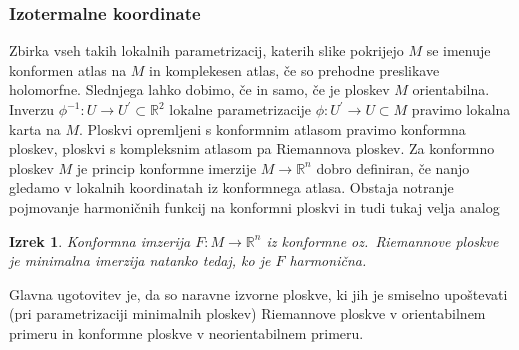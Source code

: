 \documentclass[8pt]{beamer}
\theoremstyle{definition}
\theoremstyle{remark}
\theoremstyle{plain}
\newtheorem{izrek}[definicija]{Izrek}
\numberwithin{equation}{section}  %
\begin{document}
\begin{frame}
    \frametitle{Izotermalne koordinate}
                                                                                                                                                                                                                                                    
    Zbirka vseh takih lokalnih parametrizacij, katerih slike pokrijejo $M$ se imenuje \textcolor{red1}{konformen atlas} na $M$ in \textcolor{red1}{komplekesen atlas}, če so prehodne preslikave holomorfne. Slednjega lahko dobimo, če in samo, če je ploskev $M$ orientabilna. Inverzu $\phi^{-1}: U \rightarrow U^{\prime} \subset \mathbb{R}^2$ lokalne parametrizacije $\phi: U^{\prime} \rightarrow U \subset M$ pravimo \textcolor{red1}{lokalna karta} na $M$. Ploskvi opremljeni s konformnim atlasom pravimo \textcolor{red1}{konformna ploskev}, ploskvi s kompleksnim atlasom pa \textcolor{red1}{Riemannova ploskev}. Za konformno ploskev $M$ je princip konformne imerzije $M \rightarrow \mathbb{R}^n$ dobro definiran, če nanjo gledamo v lokalnih koordinatah iz konformnega atlasa. Obstaja notranje pojmovanje harmoničnih funkcij na konformni ploskvi in tudi tukaj velja analog 
    \begin{izrek}
        \emph{Konformna imzerija $F: M \rightarrow \mathbb{R}^n$ iz konformne oz.~Riemannove ploskve je minimalna imerzija natanko tedaj, ko je $F$ harmonična}.
    \end{izrek}
    Glavna ugotovitev je, da so naravne izvorne ploskve, ki jih je smiselno upoštevati (pri parametrizaciji minimalnih ploskev) Riemannove ploskve v orientabilnem primeru in konformne ploskve v neorientabilnem primeru. 

\end{frame}
\end{document}

